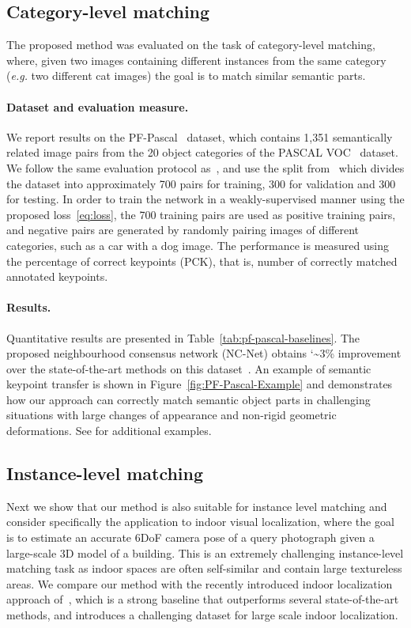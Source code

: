 \documentclass{article}
\begin{document}
\subsection{Category-level matching}
The proposed method was evaluated on the task of category-level matching, where, given two images containing different instances from the same category (\emph{e.g.} two different cat images) the goal is to match similar semantic parts. 

\paragraph{Dataset and evaluation measure.}
We report results on the PF-Pascal~\cite{ham2017proposal} dataset, which contains 1,351 semantically related image pairs from the 20 object categories of the PASCAL VOC~\cite{pascal-voc-2011} dataset. We follow the same evaluation protocol as~\cite{scnet,Rocco18}, and use the split from~\cite{scnet} which divides the dataset into approximately 700 pairs for training, 300 for validation and 300 for testing. In order to train the network in a weakly-supervised manner using the proposed loss~\eqref{eq:loss}, the 700 training pairs are used as positive training pairs, and negative pairs are generated by randomly pairing images of different categories, such as a car with a dog image. The performance is measured using the percentage of correct keypoints (PCK), that is, number of correctly matched annotated keypoints. 
\paragraph{Results.}
Quantitative results are presented in Table~\ref{tab:pf-pascal-baselines}. The proposed neighbourhood consensus network (NC-Net) obtains {\char`\~}3\% improvement over the state-of-the-art methods on this dataset~\cite{Rocco18}. 
An example of semantic keypoint transfer is shown in Figure~\ref{fig:PF-Pascal-Example} and demonstrates how our approach can correctly match semantic object parts in challenging situations with large changes of appearance and non-rigid geometric deformations. See  for additional examples.
\subsection{Instance-level matching}
Next we show that our method is also suitable for instance level matching and consider specifically the application to indoor visual localization, where the goal is to estimate an accurate 6DoF camera pose of a query photograph given a large-scale 3D model of a building. This is an extremely challenging instance-level matching task as indoor spaces are often self-similar and contain large textureless areas. We compare our method with the recently introduced indoor localization approach of~\cite{Taira18}, which is a strong baseline that outperforms several state-of-the-art methods, and introduces a challenging dataset for large scale indoor localization. 
\end{document}
